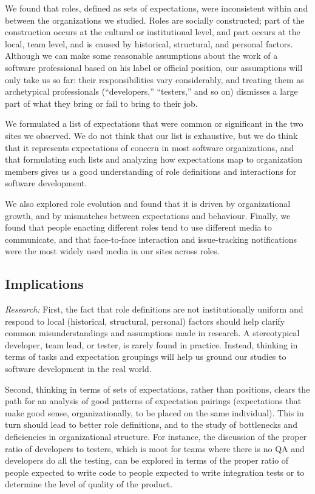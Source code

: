 \documentclass[10pt, conference, compsocconf]{IEEEtran}
\begin{document}
We found that roles, defined as sets of expectations, were inconsistent within and between the organizations we studied. Roles are socially constructed; part of the construction occurs at the cultural or institutional level, and part occurs at the local, team level, and is caused by historical, structural, and personal factors. Although we can make some reasonable assumptions about the work of a software professional based on his label or official position, our assumptions will only take us so far: their responsibilities vary considerably, and treating them as archetypical professionals (``developers,'' ``testers,'' and so on) dismisses a large part of what they bring or fail to bring to their job.

We formulated a list of expectations that were common or significant in the two sites we observed. We do not think that our list is exhaustive, but we do think that it represents expectations of concern in most software organizations, and that formulating such lists and analyzing how expectations map to organization members gives us a good understanding of role definitions and interactions for software development.

We also explored role evolution and found that it is driven by organizational growth, and by mismatches between expectations and behaviour. Finally, we found that people enacting different roles tend to use different media to communicate, and that face-to-face interaction and issue-tracking notifications were the most widely used media in our sites across roles.


\subsection{Implications}

\emph{Research:} First, the fact that role definitions are not institutionally uniform and respond to local (historical, structural, personal) factors should help clarify common misunderstandings and assumptions made in research. A stereotypical developer, team lead, or tester, is rarely found in practice. Instead, thinking in terms of tasks and expectation groupings will help us ground our studies to software development in the real world.

Second, thinking in terms of sets of expectations, rather than positions, clears the path for an analysis of good patterns of expectation pairings (expectations that make good sense, organizationally, to be placed on the same individual). This in turn should lead to better role definitions, and to the study of bottlenecks and deficiencies in organizational structure. For instance, the discussion of the proper ratio of developers to testers, which is moot for teams where there is no QA and developers do all the testing, can be explored in terms of the proper ratio of people expected to write code to people expected to write integration tests or to determine the level of quality of the product.
\end{document}
